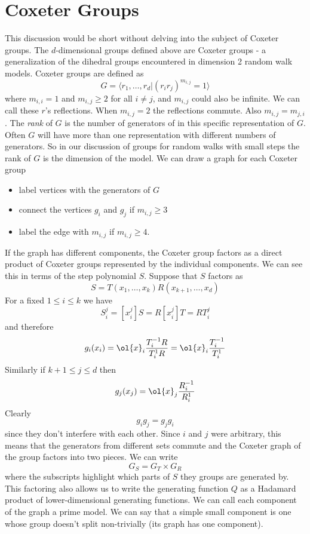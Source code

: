 \section{Coxeter Groups}

This discussion would be short without delving into the subject of Coxeter groups. The $d$-dimensional groups defined above are Coxeter groups - a generalization of the dihedral groups encountered in dimension 2 random walk models. Coxeter groups are defined as
\[
	G = \langle r_1,\ldots, r_d |(r_ir_j)^{m_{i,j}} = 1\rangle
\]
where $m_{i,i} = 1$ and $m_{i,j} \ge 2$ for all $i\neq j$, and $m_{i,j}$ could also be infinite. We can call these $r$'s reflections. When $m_{i,j} = 2$ the reflections commute. Also $m_{i,j} = m_{j,i}$. The \emph{rank} of $G$ is the number of generators of in this specific representation of $G$. Often $G$ will have more than one representation with different numbers of generators. So in our discussion of groups for random walks with small steps the rank of $G$ is the dimension of the model. We can draw a graph for each Coxeter group
\begin{itemize}
\item label vertices with the generators of $G$
\item connect the vertices $g_i$ and $g_j$ if $m_{i,j} \ge 3$
\item label the edge with $m_{i,j}$ if $m_{i,j}\ge 4$.
\end{itemize}
If the graph has different components, the Coxeter group factors as a direct product of Coxeter groups represented by the individual components. We can see this in terms of the step polynomial $S$. Suppose that $S$ factors as
\[
	S = T(x_1,\ldots,x_k)R(x_{k+1},\ldots,x_d)
\]
For a fixed $1 \leq i \leq k$ we have
\[
	S_i^j = [x_i^j]S = R[x_i^j]T = R T_i^j
\]
and therefore
\[
	g_i(x_i) = \ol{x}_i\frac{T_i^{-1}R}{T_i^1R} = \ol{x}_i\frac{T_i^{-1}}{T_i^1}
\]
Similarly if $k+1\leq j\leq d$ then
\[
	g_j(x_j) = \ol{x}_j\frac{R_i^{-1}}{R_i^1}
\]
Clearly
\[
	g_ig_j = g_jg_i
\]
since they don't interfere with each other. Since $i$ and $j$ were arbitrary, this means that the generators from different sets commute and the Coxeter graph of the group factors into two pieces. We can write
\[
	G_S = G_T \times G_R
\]
where the subscripts highlight which parts of $S$ they groups are generated by. This factoring also allows us to write the generating function $Q$ as a Hadamard product of lower-dimensional generating functions. We can call each component of the graph a prime model. We can say that a simple small component is one whose group doesn't split non-trivially (its graph has one component).

